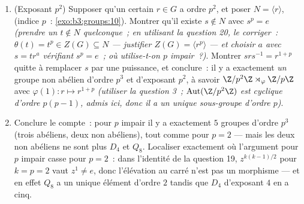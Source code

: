 \begin{problem}
\begin{enumerate}[resume]
        utilisant $N^3 = 0$ et $p \geq 3$)~: tout groupe non
        abélien d'exposant $p$ et d'ordre $p^3$ est isomorphe à
        $H_p$.
  \item (Exposant $p^2$) Supposer qu'un certain $r \in G$ a ordre
        $p^2$, et poser $N = \langle r\rangle$,  (indice
        $p$~: \cref{exo:b3:groups:10}). Montrer qu'il existe $s
        \notin N$ avec $s^p = e$ \emph{(prendre un $t \notin N$
        quelconque~; en utilisant la question 20, le corriger~:
        $\theta(t) = t^p \in Z(G) \subseteq N$ --- justifier
        $Z(G) = \langle r^p\rangle$ --- et choisir $a$ avec $s =
        tr^{a}$ vérifiant $s^p = e$~; où utilise-t-on $p$
        impair~?)}. Montrer $srs^{-1} = r^{1+p}$ quitte à
        remplacer $s$ par une puissance, et conclure~: il y a
        exactement \emph{un} groupe non abélien d'ordre $p^3$ et
        d'exposant $p^2$, à savoir $\Z/p^2\Z \rtimes_\varphi
        \Z/p\Z$ avec $\varphi(1)\colon r \mapsto r^{1+p}$
        \emph{(utiliser la question 3~;
        $\operatorname{Aut}(\Z/p^2\Z)$ est cyclique d'ordre
        $p(p-1)$, admis ici, donc il a un unique sous-groupe
        d'ordre $p$)}.
  \item Conclure le compte~: pour $p$ impair il y a exactement $5$
        groupes d'ordre $p^3$ (trois abéliens, deux non
        abéliens), tout comme pour $p = 2$ --- mais les deux non
        abéliens ne sont plus $D_4$ et $Q_8$. Localiser exactement
        où l'argument pour $p$ impair casse pour $p = 2$~: dans
        l'identité de la question 19, $z^{k(k-1)/2}$ pour $k = p
        = 2$ vaut $z^1 \neq e$, donc l'élévation au carré n'est
        pas un morphisme --- et en effet $Q_8$ a un unique
        élément d'ordre $2$ tandis que $D_4$ d'exposant $4$ en a
        cinq.
\end{enumerate}


\end{problem}
